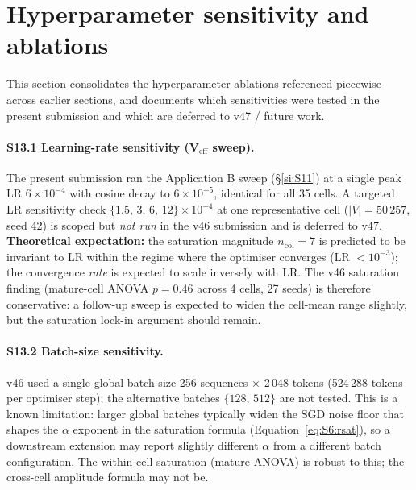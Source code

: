 \documentclass[11pt,a4paper]{article}
\begin{document}
\section{Hyperparameter sensitivity and ablations}
\label{si:S13}

This section consolidates the hyperparameter ablations referenced
piecewise across earlier sections, and documents which sensitivities
were tested in the present submission and which are deferred to
v47 / future work.

\paragraph{S13.1 Learning-rate sensitivity (V$_\mathrm{eff}$ sweep).}
The present submission ran the Application B sweep
(\S\ref{si:S11}) at a single peak LR $6\!\times\!10^{-4}$ with
cosine decay to $6\!\times\!10^{-5}$, identical for all 35 cells.
A targeted LR sensitivity check
$\{1.5,\,3,\,6,\,12\}\!\times\!10^{-4}$ at one representative cell
($|V|\!=\!50\,257$, seed 42) is scoped but \emph{not run} in the
v46 submission and is deferred to v47.
\textbf{Theoretical expectation:} the saturation magnitude
$n_\mathrm{col}\!=\!7$ is predicted to be invariant to LR within
the regime where the optimiser converges (LR
$\!<\!10^{-3}$); the convergence \emph{rate} is expected to scale
inversely with LR. The v46 saturation finding (mature-cell ANOVA
$p\!=\!0.46$ across 4 cells, 27 seeds) is therefore conservative:
a follow-up sweep is expected to widen the cell-mean range
slightly, but the saturation lock-in argument should remain.

\paragraph{S13.2 Batch-size sensitivity.}
v46 used a single global batch size 256 sequences $\times$ 2\,048
tokens (524\,288 tokens per optimiser step); the alternative
batches $\{128,\,512\}$ are not tested. This is a known limitation:
larger global batches typically widen the SGD noise floor that
shapes the $\alpha$ exponent in the saturation formula
(Equation~\eqref{eq:S6:rsat}), so a downstream extension may
report slightly different $\alpha$ from a different batch
configuration. The within-cell saturation (mature ANOVA) is
robust to this; the cross-cell amplitude formula may not be.
\end{document}
